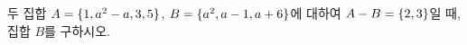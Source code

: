 두 집합 $A=\{1{,}\mkern3mu\mathopen{}a^2-a{,}\mkern3mu\mathopen{}3{,}\mkern3mu\mathopen{}5\}$, $B=\{a^2{,}\mkern3mu\mathopen{}a-1{,}\mkern3mu\mathopen{}a+6\}$에 대하여 $A-B=\{2{,}\mkern3mu\mathopen{}3\}$일 때, 집합 $B$를 구하시오. 
